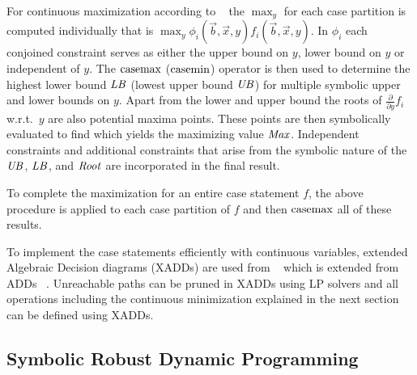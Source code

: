 For continuous maximization according to ~\cite{sdp_aaai} the $\max_y$ for each case partition
is computed individually that is $\max_y \phi_i(\vec{b},\vec{x},y) f_i(\vec{b},\vec{x},y)$.
In $\phi_i$ each conjoined constraint serves as either the upper bound on $y$, lower bound on $y$ or independent of $y$. The $\mathrm{casemax}$ ($\mathrm{casemin}$) operator is then used to determine the highest lower bound $\mathit{LB}$
(lowest upper bound $\mathit{UB}$) for multiple symbolic upper and lower bounds on $y$.
Apart from the lower and upper bound the roots of $\frac{\partial}{\partial y} f_i$ 
w.r.t.\ $y$  are also potential maxima points. These points are then symbolically evaluated to find which yields the
maximizing value $\mathit{Max}$.  Independent constraints and additional constraints that arise from the
symbolic nature of the $\mathit{UB}$, $\mathit{LB}$, and $\mathit{Root}$ are incorporated in the final result.

To complete the maximization for an entire case statement $f$, the
above procedure is applied to each case partition of $f$ and then $\mathrm{casemax}$ all
of these results.  

To implement the case statements efficiently with continuous variables, extended Algebraic Decision diagrams (XADDs) are used from ~\cite{sanner_uai11} which is extended from ADDs ~\cite{bahar93add}. Unreachable paths can be pruned in XADDs using LP solvers and all operations including the continuous minimization explained in the next section can be defined using XADDs. 


\subsection{Symbolic Robust Dynamic Programming}